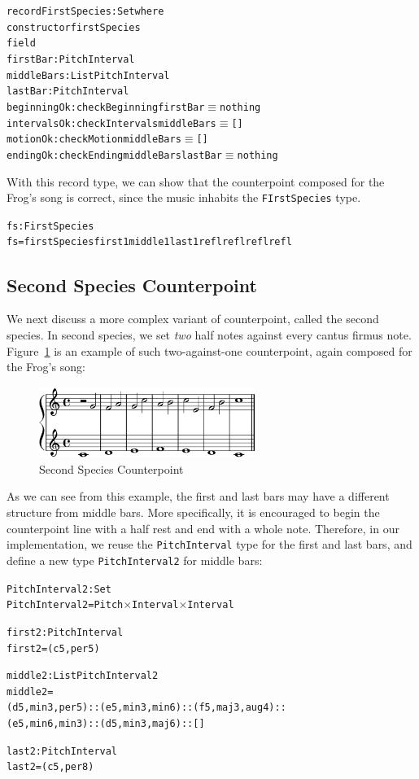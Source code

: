\begin{alltt}
record FirstSpecies : Set where
  constructor firstSpecies
  field
    firstBar    : PitchInterval
    middleBars  : List PitchInterval
    lastBar     : PitchInterval
    beginningOk : checkBeginning firstBar \(\equiv\) nothing
    intervalsOk : checkIntervals middleBars \(\equiv\) []
    motionOk    : checkMotion middleBars \(\equiv\) []
    endingOk    : checkEnding middleBars lastBar \(\equiv\) nothing
\end{alltt}

With this record type, we can show that the counterpoint composed
for the Frog's song is correct, since the music inhabits the
\texttt{FIrstSpecies} type.

\begin{alltt}
fs : FirstSpecies
fs = firstSpecies first1 middle1 last1 refl refl refl refl
\end{alltt}

\subsection{Second Species Counterpoint}
\label{sec:cp:ss}

We next discuss a more complex variant of counterpoint, called the
second species.
In second species, we set \emph{two} half notes against every cantus
firmus note.
Figure~\ref{fig:ss} is an example of such two-against-one counterpoint,
again composed for the Frog's song:

\begin{figure}[h]
  \includegraphics[width=7cm]{fig/ss.png}
  \caption{Second Species Counterpoint}
  \label{fig:ss}
\end{figure}
  
As we can see from this example, the first and last bars may have
a different structure from middle bars.
More specifically, it is encouraged to begin the counterpoint line with
a half rest and end with a whole note.
Therefore, in our implementation, we reuse the \texttt{PitchInterval} 
type for the first and last bars, and define a new type
\texttt{PitchInterval2} for middle bars:

\begin{alltt}
PitchInterval2 : Set
PitchInterval2 = Pitch \(\times\) Interval \(\times\) Interval

first2 : PitchInterval
first2 = (c 5 , per5)

middle2 : List PitchInterval2
middle2 =
  (d 5 , min3 , per5) :: (e 5 , min3 , min6) :: (f 5 , maj3 , aug4) ::
  (e 5 , min6 , min3) :: (d 5 , min3 , maj6) :: []

last2 : PitchInterval
last2 = (c 5 , per8)
\end{alltt}

